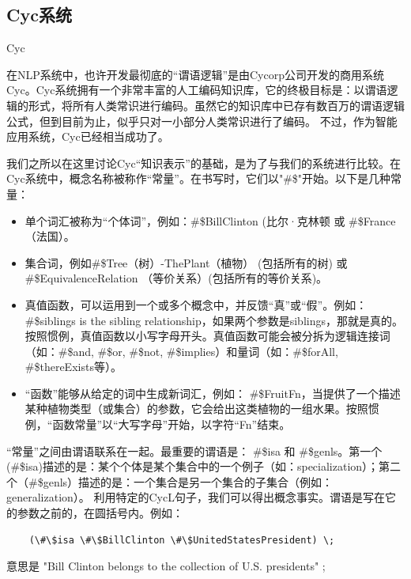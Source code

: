 \subsection{Cyc系统}{Cyc}

在NLP系统中，也许开发最彻底的“谓语逻辑”是由Cycorp公司开发的商用系统Cyc\cite{Lenat1990}。Cyc系统拥有一个非常丰富的人工编码知识库，它的终极目标是：以谓语逻辑的形式，将所有人类常识进行编码。虽然它的知识库中已存有数百万的谓语逻辑公式，但到目前为止，似乎只对一小部分人类常识进行了编码。 不过，作为智能应用系统，Cyc已经相当成功了。

我们之所以在这里讨论Cyc“知识表示”的基础，是为了与我们的系统进行比较。在Cyc系统中，概念名称被称作“常量”。在书写时，它们以"\#\$"开始。以下是几种常量：

\begin{itemize}
\item 单个词汇被称为“个体词”，例如：\#\$BillClinton (比尔·克林顿 或 \#\$France（法国）。
\item 集合词，例如\#\$Tree（树）-ThePlant（植物） (包括所有的树) 或 \#\$EquivalenceRelation （等价关系）(包括所有的等价关系)。
\item 真值函数，可以运用到一个或多个概念中，并反馈“真”或“假”。例如：\#\$siblings is the sibling relationship，如果两个参数是siblings，那就是真的。按照惯例，真值函数以小写字母开头。真值函数可能会被分拆为逻辑连接词（如：\#\$and, \#\$or, \#\$not, \#\$implies）和量词（如：\#\$forAll, \#\$thereExists等）。
\item “函数”能够从给定的词中生成新词汇，例如：
\#\$FruitFn，当提供了一个描述某种植物类型（或集合）的参数，它会给出这类植物的一组水果。按照惯例，“函数常量”以“大写字母”开始，以字符“Fn”结束。
\end{itemize}

“常量”之间由谓语联系在一起。最重要的谓语是： \#\$isa 和 \#\$genls。第一个(\#\$isa)描述的是：某个个体是某个集合中的一个例子（如：specialization）；第二个（\#\$genls）描述的是：一个集合是另一个集合的子集合（例如：generalization）。
利用特定的CycL句子，我们可以得出概念事实。谓语是写在它的参数之前的，在圆括号内。例如：

 {\tt\begin{small}\begin{lstlisting}
    (\#\$isa \#\$BillClinton \#\$UnitedStatesPresident) \;
    \end{lstlisting}\end{small}}

\noindent 意思是 "Bill Clinton belongs to the collection of U.S. presidents" ;


